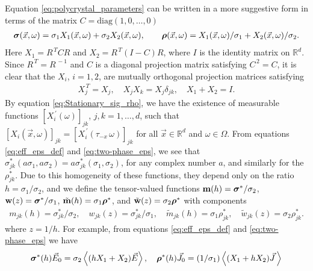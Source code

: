 \documentclass[11pt]{amsart}
\newcommand\bsig{\mbox{\boldmath${\sigma}$}}
\newcommand\brho{\mbox{\boldmath${\rho}$}}
\begin{document}
Equation \eqref{eq:polycrystal_parameters} can be written in a more
suggestive form in terms of the matrix $C=\text{diag}(1,0,\ldots,0)$  
%
\begin{align}\label{eq:two-phase_eps}
  \bsig(\vec{x},\omega)=\sigma_1X_1(\vec{x},\omega)+\sigma_2X_2(\vec{x},\omega), \qquad
  \brho(\vec{x},\omega)=X_1(\vec{x},\omega)/\sigma_1+X_2(\vec{x},\omega)/\sigma_2.
\end{align}
%
Here $X_1=R^{\,T}CR$ and $X_2=R^{\,T}(I-C)R$, where $I$ is the
identity matrix on $\mathbb{R}^d$. Since $R^{\,T}=R^{\,-1}$ and $C$
is a diagonal projection matrix satisfying $C^{\,2}=C$, it is
clear that the $X_i$, $i=1,2$, are mutually orthogonal projection
matrices satisfying
%
\begin{align}\label{eq:Projection_Matrices}
  X_j^{\,T}=X_j, \quad X_jX_k=X_j\delta_{jk}, \quad X_1+X_2=I.
\end{align}
%
By equation
\eqref{eq:Stationary_sig_rho}, we have the existence of measurable
functions $[X_i^{\,\prime}(\omega)]_{jk}$, $j,k=1,\ldots,d$, such that
$[X_i(\vec{x},\omega)]_{jk}=[X_i^{\,\prime}(\tau_{-x}\,\omega)]_{jk}$ for all
$\vec{x}\in\mathbb{R}^d$ and $\omega\in\Omega$. From equations
\eqref{eq:eff_eps_def} and \eqref{eq:two-phase_eps}, we see that
$\sigma_{jk}^*(a\sigma_1,a\sigma_2)=a\sigma_{jk}^*(\sigma_1,\sigma_2)$, for any complex
number $a$, and similarly for the $\rho_{jk}^*$. Due to this homogeneity
of these functions, they depend only on the ratio $h=\sigma_1/\sigma_2$, and we
define the tensor-valued functions $\mathbf{m}(h)=\bsig^*/\sigma_2$,
$\mathbf{w}(z)=\bsig^*/\sigma_1$, $\tilde{\mathbf{m}}(h)=\sigma_1\brho^*$, and
$\tilde{\mathbf{w}}(z)=\sigma_2\brho^*$ with components  
%
\begin{align}\label{eq:m_h}
  m_{jk}(h)=\sigma_{jk}^*/\sigma_2, \quad
  w_{jk}(z)=\sigma_{jk}^*/\sigma_1, \quad
   \tilde{m}_{jk}(h)=\sigma_1\rho_{jk}^*, \quad
   \tilde{w}_{jk}(z)=\sigma_2\rho_{jk}^*.
\end{align}
%
where $z=1/h$. For example, from equations \eqref{eq:eff_eps_def} and
\eqref{eq:two-phase_eps} we have
%
\begin{align}\label{eq:eps*_rho*_h}
  \bsig^*(h)\vec{E}_0=\sigma_2\left\langle(hX_1+X_2)\vec{E}\right\rangle,
  \quad
  \brho^*(h)\vec{J}_0=(1/\sigma_1)\left\langle(X_1+hX_2)\vec{J}\,\right\rangle
\end{align}
%
\end{document}

